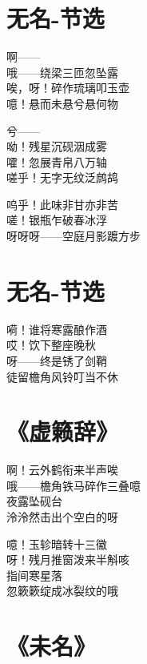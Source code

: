 \clearpage


\section{无名-节选}

啊—— \\
哦——绕梁三匝忽坠露 \\
唉，呀！碎作琉璃叩玉壶 \\
噫！悬而未悬兮悬何物
\vspace{1em}

兮—— \\
呦！残星沉砚洇成雾 \\
嚯！忽展青帛八万轴 \\
嗟乎！无字无纹泛鹧鸪
\vspace{1em}

呜乎！此味非甘亦非苦 \\
嗟！银瓶乍破春冰浮 \\
呀呀呀——空庭月影踱方步

\clearpage


\section{无名-节选}

嗬！谁将寒露酿作酒 \\
哎！饮下整座晚秋 \\
呀——终是锈了剑鞘 \\
徒留檐角风铃叮当不休

\clearpage


\section{《虚籁辞》}

啊！云外鹤衔来半声唉 \\
哦——檐角铁马碎作三叠噫 \\
夜露坠砚台 \\
泠泠然击出个空白的呀
\vspace{1em}

噫！玉轸暗转十三徽 \\
呀！残月推窗泼来半斛咳 \\
指间寒星落 \\
忽簌簌绽成冰裂纹的哦

\clearpage


\section{《未名》}

